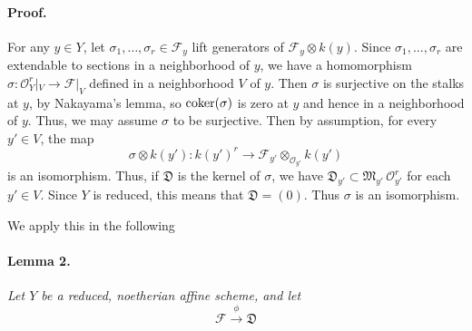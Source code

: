 \paragraph{Proof.}
For any $y \in Y$, let $\sigma_1, \ldots, \sigma_r \in \mathscr{F}_y$ lift
generators of $\mathscr{F}_y \otimes k(y)$. Since
$\sigma_1, \ldots, \sigma_r$ are extendable to sections in a neighborhood of
$y$, we have a homomorphism
$\sigma : \mathcal{O}_Y^r|_V \to \mathscr{F}|_V$ defined in a neighborhood
$V$ of $y$. Then $\sigma$ is surjective on the stalks at $y$, by Nakayama's
lemma, so $\operatorname{coker}(\sigma)$ is zero at $y$ and hence in a neighborhood of $y$.
Thus, we may assume $\sigma$ to be surjective. Then by assumption, for every
$y' \in V$, the map
\[
  \sigma \otimes k(y') : k(y')^r \to \mathscr{F}_{y'} \otimes_{\mathcal{O}_{y'}} k(y')
\]
is an isomorphism. Thus, if $\mathfrak{D}$ is the kernel of $\sigma$, we have
$\mathfrak{D}_{y'} \subset \mathfrak{M}_{y'}\, \mathcal{O}_{y'}^r$ for each
$y' \in V$. Since $Y$ is reduced, this means that $\mathfrak{D} = (0)$. Thus
$\sigma$ is an isomorphism.

We apply this in the following

\paragraph{Lemma 2.}
\textit{Let $Y$ be a reduced, noetherian affine scheme, and let}
\[
  \mathscr{F} \xrightarrow{\ \phi\ } \mathfrak{D}
\]
